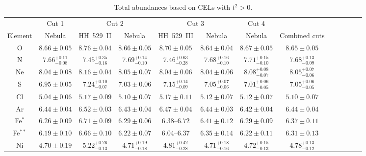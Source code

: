 \documentclass[fleqn,usenatbib]{mnras}
\begin{document}
 

\begin{table*}
\centering
\caption{Total abundances based on CELs with $t^2>0$.}
\label{tab:total_abundances_cels_t2}
\begin{adjustbox}{width=\textwidth}
\begin{tabular}{ccccccccccccc}
\hline
 & \multicolumn{1}{c}{Cut 1} & \multicolumn{2}{c}{Cut 2} & \multicolumn{2}{c}{Cut 3} & \multicolumn{1}{c}{Cut 4} \\
Element &  Nebula & HH~529~II &  Nebula & HH~529~III &  Nebula &  Nebula & Combined cuts\\
\hline

O & $8.66 \pm 0.05$ &$8.76 \pm 0.04$ & $8.66 \pm 0.05$ & $8.70 \pm 0.05$  & $8.64 \pm 0.04$ & $8.67 \pm 0.05$ & $8.65 \pm 0.05$\\

N & $7.66 ^{+0.11} _{-0.08}$ & $7.45 ^{+0.35} _{-0.16}$ & $7.69 ^{+0.14} _{-0.10}$ & $7.46 ^{+0.63} _{-0.28}$  & $7.68 ^{+0.16} _{-0.10}$& $7.71 ^{+0.15} _{-0.10}$ & $7.68 ^{+0.13} _{-0.09}$\\

Ne & $8.04 \pm 0.08$ & $8.16 \pm 0.04$ & $8.05 \pm 0.07$& $8.04 \pm 0.06$  & $8.04 \pm 0.06$& $8.08 ^{+0.08} _{-0.07}$ & $8.05 ^{+0.07} _{-0.06}$\\

S& $6.95 \pm 0.05$ & $7.24 ^{+0.10} _{-0.07}$ & $7.03 \pm 0.06$ & $7.15 ^{+0.14} _{-0.09}$  & $7.05 ^{+0.07} _{-0.06}$ & $7.01 ^{+0.06} _{-0.05}$& $7.05 ^{+0.06} _{-0.05}$\\

Cl &  $5.04 \pm 0.06$ & $5.17 \pm 0.09$ & $5.10 \pm 0.07$ & $5.17 \pm 0.11$ & $5.12 \pm 0.07$ & $5.12 \pm 0.07$ & $5.10 \pm 0.07$\\

Ar & $6.44 \pm 0.04$ & $6.52 \pm 0.03$ & $6.43 \pm 0.04$ & $6.47 \pm 0.04$ & $6.44 \pm 0.03$ & $6.42 \pm 0.04$ & $6.44 \pm 0.04$\\

Fe$^{*}$ & $6.26 \pm 0.09$ & $6.71 \pm 0.09$ & $6.29 \pm 0.06$&  6.38--6.72 & $6.41 \pm 0.12$ & $6.29 \pm 0.09$& $6.37 \pm 0.11$\\

Fe$^{**}$ & $6.19 \pm 0.10$ & $6.66 \pm 0.10$ & $6.22 \pm 0.07$&   6.04--6.37  & $6.35 \pm 0.14$ & $6.22 \pm 0.11$& $6.31 \pm 0.13$\\

Ni & $4.70 \pm 0.19$ & $5.22 ^{+0.26} _{-0.13}$ & $4.71 ^{+0.19} _{-0.18}$ & $4.81 ^{+0.42} _{-0.28}$  & $4.71 ^{+0.18} _{-0.16}$&  $4.72 ^{+0.15} _{-0.13}$& $4.78 ^{+0.13} _{-0.12}$\\


\end{tabular}
\end{adjustbox}
\end{table*}
\end{document}
